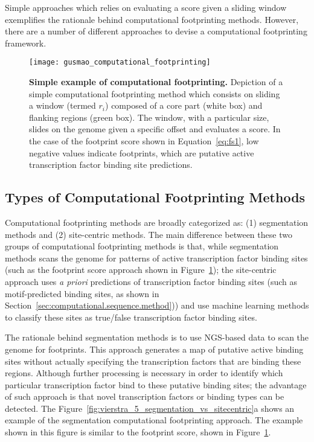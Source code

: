 Simple approaches which relies on evaluating a score given a sliding window exemplifies the rationale behind computational footprinting methods. However, there are a number of different approaches to devise a computational footprinting framework.

\begin{figure}[h!]
\centering
\texttt{[image: gusmao\_computational\_footprinting]}
\caption[Simple example of computational footprinting]{\textbf{Simple example of computational footprinting.} Depiction of a simple computational footprinting method which consists on sliding a window (termed $r_i$) composed of a core part (white box) and flanking regions (green box). The window, with a particular size, slides on the genome given a specific offset and evaluates a score. In the case of the footprint score shown in Equation~\ref{eq:fs1}, low negative values indicate footprints, which are putative active transcription factor binding site predictions.}
\label{fig:gusmao_computational_footprinting}
\end{figure}


\subsection{Types of Computational Footprinting Methods}
\label{sec:types.computational.footprinting.methods}

Computational footprinting methods are broadly categorized as: (1) segmentation methods and (2) site-centric methods. The main difference between these two groups of computational footprinting methods is that, while segmentation methods scans the genome for patterns of active transcription factor binding sites (such as the footprint score approach shown in Figure~\ref{fig:gusmao_computational_footprinting}); the site-centric approach uses \emph{a priori} predictions of transcription factor binding sites (such as motif-predicted binding sites, as shown in Section~\ref{sec:computational.sequence.method})) and use machine learning methods to classify these sites as true/false transcription factor binding sites.

The rationale behind segmentation methods is to use NGS-based data to scan the genome for footprints. This approach generates a map of putative active binding sites without actually specifying the transcription factors that are binding these regions. Although further processing is necessary in order to identify which particular transcription factor bind to these putative binding sites; the advantage of such approach is that novel transcription factors or binding types can be detected. The Figure~\ref{fig:vierstra_5_segmentation_vs_sitecentric}a shows an example of the segmentation computational footprinting approach. The example shown in this figure is similar to the footprint score, shown in Figure~\ref{fig:gusmao_computational_footprinting}.

